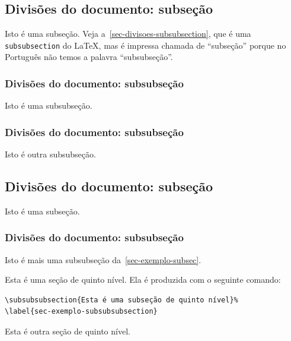 \subsection{Divisões do documento: subseção}%
\label{sec-divisoes-subsection}

Isto é uma subseção. Veja a~\autoref{sec-divisoes-subsubsection}, que é uma
\texttt{subsubsection} do \LaTeX, mas é impressa chamada de ``subseção'' porque
no Português não temos a palavra ``subsubseção''.

\subsubsection{Divisões do documento: subsubseção}%
\label{sec-divisoes-subsubsection}

Isto é uma subsubseção.

\subsubsection{Divisões do documento: subsubseção}

Isto é outra subsubseção.

\subsection{Divisões do documento: subseção}%
\label{sec-exemplo-subsec}

Isto é uma subseção.

\subsubsection{Divisões do documento: subsubseção}

Isto é mais uma subsubseção da~\autoref{sec-exemplo-subsec}.


%
\label{sec-exemplo-subsubsubsection}

Esta é uma seção de quinto nível. Ela é produzida com o seguinte comando:

\begin{verbatim}
\subsubsubsection{Esta é uma subseção de quinto nível}%
\label{sec-exemplo-subsubsubsection}
\end{verbatim}

%
\label{sec-exemplo-subsubsubsection-outro}

Esta é outra seção de quinto nível.


